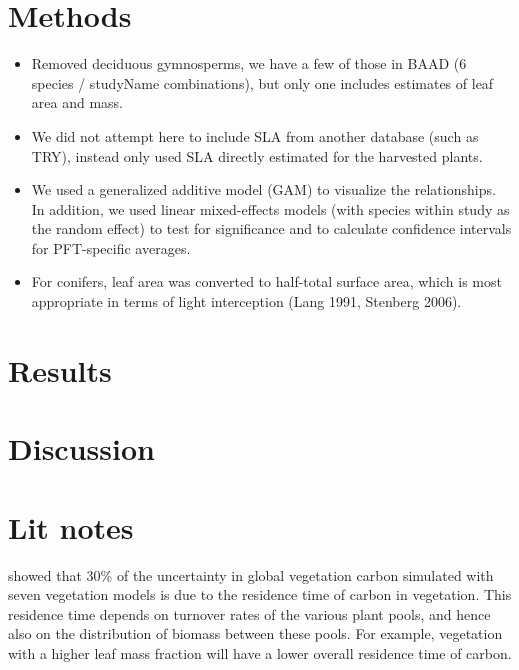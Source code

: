 \documentclass[a4paper]{article}
\begin{document}
\section{Methods}

\begin{itemize}
  \item Removed deciduous gymnosperms, we have a few of those in BAAD (6 species / studyName combinations), but only one includes estimates of leaf area and mass. 
  \item We did not attempt here to include SLA from another database (such as TRY), instead only used SLA directly estimated for the harvested plants.
  \item We used a generalized additive model (GAM) to visualize the relationships. In addition, we used linear mixed-effects models (with species within study as the random effect) to test for significance and to calculate confidence intervals for PFT-specific averages.
  \item For conifers, leaf area was converted to half-total surface area, which is most appropriate in terms of light interception (Lang 1991, Stenberg 2006).
\end{itemize}




\section{Results}




\section{Discussion}





\section{Lit notes}

\cite{friend_carbon_2014} showed that 30\% of the uncertainty in global vegetation carbon simulated with seven vegetation models is due to the residence time of carbon in vegetation. This residence time depends on turnover rates of the various plant pools, and hence also on the distribution of biomass between these pools. For example, vegetation with a higher leaf mass fraction will have a lower overall residence time of carbon.
\end{document}
